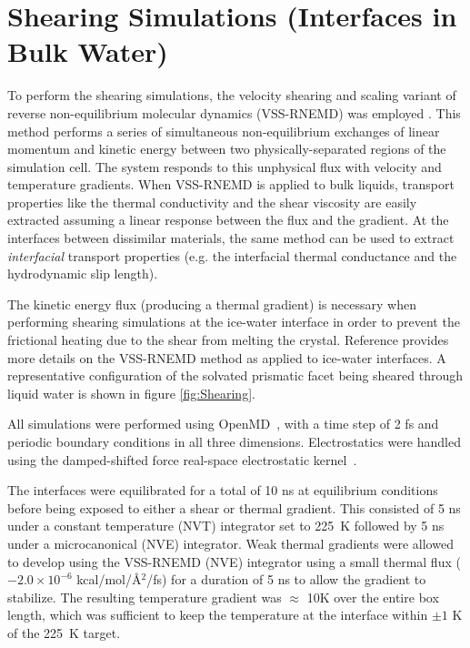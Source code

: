 \documentclass[aps,jcp,preprint,showpacs,superscriptaddress,groupedaddress]{revtex4}  %
\begin{document}
\section{Shearing Simulations (Interfaces in Bulk Water)}
To perform the shearing simulations, the velocity shearing and scaling
variant of reverse non-equilibrium molecular dynamics (VSS-RNEMD) was
employed \cite{Kuang12}. This method performs a series of simultaneous
non-equilibrium exchanges of linear momentum and kinetic energy
between two physically-separated regions of the simulation cell.  The
system responds to this unphysical flux with velocity and temperature
gradients.  When VSS-RNEMD is applied to bulk liquids, transport
properties like the thermal conductivity and the shear viscosity are
easily extracted assuming a linear response between the flux and the
gradient.  At the interfaces between dissimilar materials, the same
method can be used to extract \textit{interfacial} transport
properties (e.g. the interfacial thermal conductance and the
hydrodynamic slip length).

The kinetic energy flux (producing a thermal gradient) is necessary
when performing shearing simulations at the ice-water interface in
order to prevent the frictional heating due to the shear from melting
the crystal. Reference \citealp{Louden13} provides more details on the
VSS-RNEMD method as applied to ice-water interfaces. A representative
configuration of the solvated prismatic facet being sheared through
liquid water is shown in figure \ref{fig:Shearing}.

All simulations were performed using OpenMD~\cite{OOPSE,openmd}, with
a time step of 2 fs and periodic boundary conditions in all three
dimensions.  Electrostatics were handled using the damped-shifted
force real-space electrostatic kernel~\cite{Ewald}. 

The interfaces were equilibrated for a total of 10 ns at equilibrium
conditions before being exposed to either a shear or thermal gradient.
This consisted of 5 ns under a constant temperature (NVT) integrator
set to 225~K followed by 5 ns under a microcanonical (NVE) integrator.
Weak thermal gradients were allowed to develop using the VSS-RNEMD
(NVE) integrator using a small thermal flux ($-2.0\times 10^{-6}$
kcal/mol/\AA$^2$/fs) for a duration of 5 ns to allow the gradient to
stabilize.  The resulting temperature gradient was $\approx$ 10K over
the entire box length, which was sufficient to keep the temperature at
the interface within $\pm 1$ K of the 225~K target.
\end{document}
